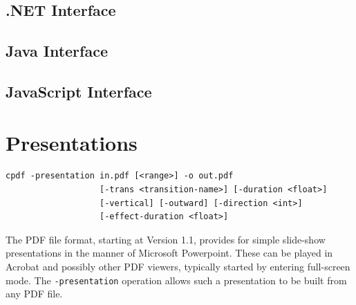 \documentclass{book}
\begin{document}
\begin{dotnetcpdflib}
\clearpage
\section*{.NET Interface}
\begin{small}\tt

\end{small}
\end{dotnetcpdflib}

\begin{jcpdflib}
\clearpage
\section*{Java Interface}
\begin{small}\tt

\end{small}
\end{jcpdflib}

\begin{jscpdflib}
\clearpage
\section*{JavaScript Interface}
\begin{small}\tt

\end{small}
\end{jscpdflib}

\chapter{Presentations}\label{chap:7}\pagestyle{fancy}
  \begin{framed}
  \small\noindent\begin{verbatim}
cpdf -presentation in.pdf [<range>] -o out.pdf
                   [-trans <transition-name>] [-duration <float>]
                   [-vertical] [-outward] [-direction <int>]
                   [-effect-duration <float>]\end{verbatim}
\end{framed}

  \vspace{12mm}
The PDF file format, starting at Version 1.1, provides for simple slide-show
presentations in the manner of Microsoft Powerpoint. These can be played in
Acrobat and possibly other PDF viewers, typically started by entering
full-screen mode. The \texttt{-presentation} operation allows such a
presentation to be built from any PDF file.
\end{document}
